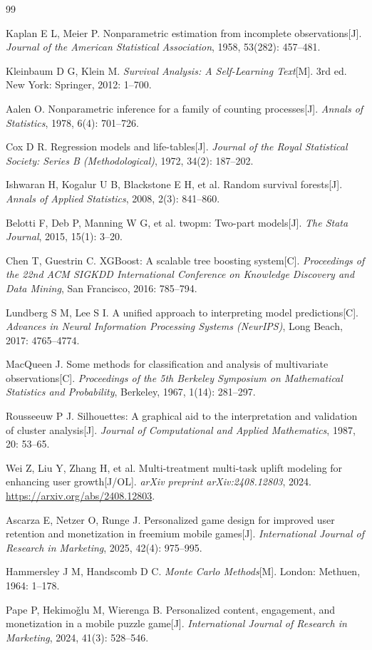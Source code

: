 \begin{thebibliography}{99}

Kaplan E L, Meier P. Nonparametric estimation from incomplete observations[J]. \emph{Journal of the American Statistical Association}, 1958, 53(282): 457--481.

Kleinbaum D G, Klein M. \emph{Survival Analysis: A Self-Learning Text}[M]. 3rd ed. New York: Springer, 2012: 1--700.

Aalen O. Nonparametric inference for a family of counting processes[J]. \emph{Annals of Statistics}, 1978, 6(4): 701--726.

Cox D R. Regression models and life-tables[J]. \emph{Journal of the Royal Statistical Society: Series B (Methodological)}, 1972, 34(2): 187--202.

Ishwaran H, Kogalur U B, Blackstone E H, et al. Random survival forests[J]. \emph{Annals of Applied Statistics}, 2008, 2(3): 841--860.

Belotti F, Deb P, Manning W G, et al. twopm: Two-part models[J]. \emph{The Stata Journal}, 2015, 15(1): 3--20.

Chen T, Guestrin C. XGBoost: A scalable tree boosting system[C]. \emph{Proceedings of the 22nd ACM SIGKDD International Conference on Knowledge Discovery and Data Mining}, San Francisco, 2016: 785--794.

Lundberg S M, Lee S I. A unified approach to interpreting model predictions[C]. \emph{Advances in Neural Information Processing Systems (NeurIPS)}, Long Beach, 2017: 4765--4774.

MacQueen J. Some methods for classification and analysis of multivariate observations[C]. \emph{Proceedings of the 5th Berkeley Symposium on Mathematical Statistics and Probability}, Berkeley, 1967, 1(14): 281--297.

Rousseeuw P J. Silhouettes: A graphical aid to the interpretation and validation of cluster analysis[J]. \emph{Journal of Computational and Applied Mathematics}, 1987, 20: 53--65.

Wei Z, Liu Y, Zhang H, et al. Multi-treatment multi-task uplift modeling for enhancing user growth[J/OL]. \emph{arXiv preprint arXiv:2408.12803}, 2024. \url{https://arxiv.org/abs/2408.12803}.

Ascarza E, Netzer O, Runge J. Personalized game design for improved user retention and monetization in freemium mobile games[J]. \emph{International Journal of Research in Marketing}, 2025, 42(4): 975--995.

Hammersley J M, Handscomb D C. \emph{Monte Carlo Methods}[M]. London: Methuen, 1964: 1--178.

Pape P, Hekimo\v{g}lu M, Wierenga B. Personalized content, engagement, and monetization in a mobile puzzle game[J]. \emph{International Journal of Research in Marketing}, 2024, 41(3): 528--546.

\end{thebibliography}
